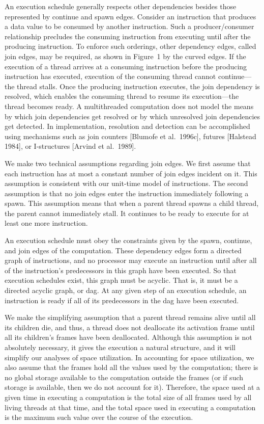 \documentclass{article}
\begin{document}
An execution schedule generally respects other dependencies besides those represented by continue and spawn edges. Consider an instruction that produces a data value to be consumed by another instruction. Such a producer/consumer relationship precludes the consuming instruction from executing until after the producing instruction. To enforce such orderings, other dependency edges, called join edges, may be required, as shown in Figure~1 by the curved edges. If the execution of a thread arrives at a consuming instruction before the producing instruction has executed, execution of the consuming thread cannot continue---the thread stalls. Once the producing instruction executes, the join dependency is resolved, which enables the consuming thread to resume its execution---the thread becomes ready. A multithreaded computation does not model the means by which join dependencies get resolved or by which unresolved join dependencies get detected. In implementation, resolution and detection can be accomplished using mechanisms such as join counters [Blumofe et al.\ 1996c], futures [Halstead 1984], or I-structures [Arvind et al.\ 1989].

We make two technical assumptions regarding join edges. We first assume that each instruction has at most a constant number of join edges incident on it. This assumption is consistent with our unit-time model of instructions. The second assumption is that no join edges enter the instruction immediately following a spawn. This assumption means that when a parent thread spawns a child thread, the parent cannot immediately stall. It continues to be ready to execute for at least one more instruction.

An execution schedule must obey the constraints given by the spawn, continue, and join edges of the computation. These dependency edges form a directed graph of instructions, and no processor may execute an instruction until after all of the instruction's predecessors in this graph have been executed. So that execution schedules exist, this graph must be acyclic. That is, it must be a directed acyclic graph, or dag. At any given step of an execution schedule, an instruction is ready if all of its predecessors in the dag have been executed.

We make the simplifying assumption that a parent thread remains alive until all its children die, and thus, a thread does not deallocate its activation frame until all its children's frames have been deallocated. Although this assumption is not absolutely necessary, it gives the execution a natural structure, and it will simplify our analyses of space utilization. In accounting for space utilization, we also assume that the frames hold all the values used by the computation; there is no global storage available to the computation outside the frames (or if such storage is available, then we do not account for it). Therefore, the space used at a given time in executing a computation is the total size of all frames used by all living threads at that time, and the total space used in executing a computation is the maximum such value over the course of the execution.
\end{document}
